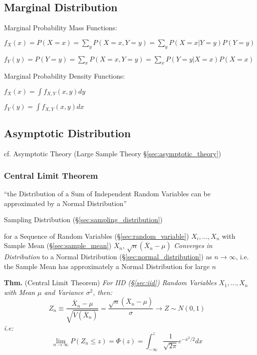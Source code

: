 \subsection{Marginal Distribution}\label{sec:marginal_distribution}

Marginal Probability Mass Functions:

$f_X(x) = P(X = x) = \sum_y P(X = x, Y = y) = \sum_y P(X = x | Y = y) P(Y = y)$

$f_Y(y) = P(Y = y) = \sum_x P(X = x, Y = y) = \sum_x P(Y = y | X = x) P(X = x)$

Marginal Probability Density Functions:

$f_X(x) = \int f_{X,Y}(x,y) dy$

$f_Y(y) = \int f_{X,Y}(x,y) dx$



\subsection{Asymptotic Distribution}\label{sec:asymptotic_distribution}

\fist cf. Asymptotic Theory (Large Sample Theory \S\ref{sec:asymptotic_theory})



\subsubsection{Central Limit Theorem}\label{sec:central_limit}

``the Distribution of a Sum of Independent Random Variables can be approximated
by a Normal Distribution''

\fist Sampling Distribution (\S\ref{sec:sampling_distribution})

for a Sequence of Random Variables (\S\ref{sec:random_variable})
$X_i, \ldots, X_n$ with Sample Mean (\S\ref{sec:sample_mean})
$\overline{X}_n$, $\sqrt{n}(\overline{X}_n - \mu)$
\emph{Converges in Distribution} to a Normal Distribution
(\S\ref{sec:normal_distribution}) as $n \rightarrow \infty$, i.e. the Sample
Mean has approximately a Normal Distribution for large $n$

\textbf{Thm.} (Central Limit Theorem) \emph{For IID (\S\ref{sec:iid}) Random
  Variables $X_1, \ldots, X_n$ with Mean $\mu$ and Variance $\sigma^2$, then:
  \[
    Z_n \equiv \frac{\overline{X}_n - \mu}{\sqrt{V(\overline{X}_n)}} =
      \frac{\sqrt{n}(\overline{X}_n - \mu)}{\sigma} \rightarrow Z \sim N(0,1)
  \]
  i.e:
  \[
    \lim_{n\rightarrow\infty} P(Z_n \leq z) = \Phi(z) =
      \int_{-\infty}^z \frac{1}{\sqrt{2\pi}}e^{-x^2/2} dx
  \]
}

